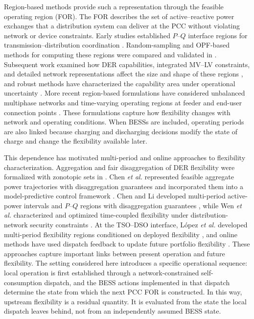 \documentclass[journal]{IEEEtran}
\begin{document}
Region-based methods provide such a representation through the feasible operating region (FOR). The FOR describes the set of active--reactive power exchanges that a distribution system can deliver at the PCC without violating network or device constraints. Early studies established $P$--$Q$ interface regions for transmission--distribution coordination \cite{capitanescu2018,silva2018flexibility}. Random-sampling and OPF-based methods for computing these regions were compared and validated in \cite{contreras2021for}. Subsequent work examined how DER capabilities, integrated MV--LV constraints, and detailed network representations affect the size and shape of these regions \cite{riaz2022characterisation,gutierrez2021}, and robust methods have characterized the capability area under operational uncertainty \cite{kalantar2020reserve}. More recent region-based formulations have considered unbalanced multiphase networks \cite{forUnbalancedPV2025} and time-varying operating regions at feeder and end-user connection points \cite{lankeshwara2024operatingregions}. These formulations capture how flexibility changes with network and operating conditions. When BESSs are included, operating periods are also linked because charging and discharging decisions modify the state of charge and change the flexibility available later.

This dependence has motivated multi-period and online approaches to flexibility characterization. Aggregation and fair disaggregation of DER flexibility were formalized with zonotopic sets in \cite{muller2019zonotopes}. Chen \emph{et al.} represented feasible aggregate power trajectories with disaggregation guarantees and incorporated them into a model-predictive control framework \cite{chen2020aggregate}. Chen and Li developed multi-period active-power intervals and $P$--$Q$ regions with disaggregation guarantees \cite{chen2021aro}, while Wen \emph{et al.} characterized and optimized time-coupled flexibility under distribution-network security constraints \cite{wen2023temporal,wen2025timecoupled}. At the TSO--DSO interface, L{\'o}pez \emph{et al.} developed multi-period flexibility regions conditioned on deployed flexibility \cite{lopez2022multiperiod}, and online methods have used dispatch feedback to update future portfolio flexibility \cite{wang2025onlinehierarchical}. These approaches capture important links between present operation and future flexibility. The setting considered here introduces a specific operational sequence: local operation is first established through a network-constrained self-consumption dispatch, and the BESS actions implemented in that dispatch determine the state from which the next PCC FOR is constructed. In this way, upstream flexibility is a residual quantity. It is evaluated from the state the local dispatch leaves behind, not from an independently assumed BESS state.
\end{document}

